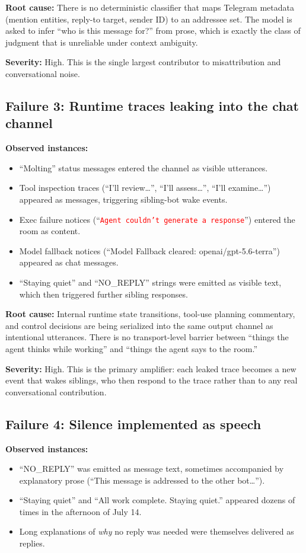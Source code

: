 \documentclass[11pt]{article}
\begin{document}
\textbf{Root cause:} There is no deterministic classifier that maps Telegram
metadata (mention entities, reply-to target, sender ID) to an addressee set.
The model is asked to infer ``who is this message for?'' from prose, which is
exactly the class of judgment that is unreliable under context ambiguity.

\textbf{Severity:} High.  This is the single largest contributor to
misattribution and conversational noise.

\subsection{Failure 3: Runtime traces leaking into the chat channel}

\textbf{Observed instances:}
\begin{itemize}
\item ``Molting'' status messages entered the channel as visible utterances.
\item Tool inspection traces (``I'll review\dots'', ``I'll assess\dots'',
``I'll examine\dots'') appeared as messages, triggering sibling-bot wake events.
\item Exec failure notices (``\textcolor{red}{\texttt{Agent couldn't
generate a response}}'') entered the room as content.
\item Model fallback notices (``Model Fallback cleared:
openai/gpt-5.6-terra'') appeared as chat messages.
\item ``Staying quiet'' and ``NO\_REPLY'' strings were emitted as visible
text, which then triggered further sibling responses.
\end{itemize}

\textbf{Root cause:} Internal runtime state transitions, tool-use planning
commentary, and control decisions are being serialized into the same output
channel as intentional utterances.  There is no transport-level barrier between
``things the agent thinks while working'' and ``things the agent says to the
room.''

\textbf{Severity:} High.  This is the primary amplifier: each leaked trace
becomes a new event that wakes siblings, who then respond to the trace rather
than to any real conversational contribution.

\subsection{Failure 4: Silence implemented as speech}

\textbf{Observed instances:}
\begin{itemize}
\item ``NO\_REPLY'' was emitted as message text, sometimes accompanied by
explanatory prose (``This message is addressed to the other bot\dots'').
\item ``Staying quiet'' and ``All work complete. Staying quiet.'' appeared
dozens of times in the afternoon of July 14.
\item Long explanations of \emph{why} no reply was needed were themselves
delivered as replies.
\end{itemize}
\end{document}
